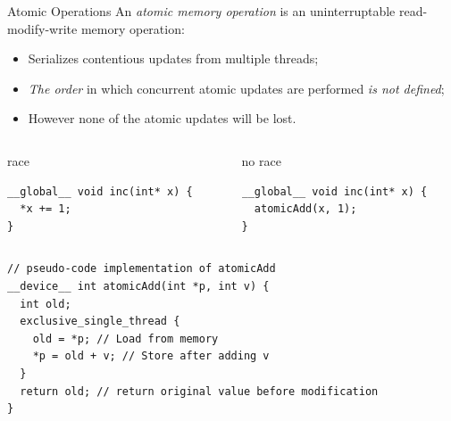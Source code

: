 \documentclass[aspectratio=43]{beamer}
\begin{document}
\begin{frame}[fragile]{Atomic Operations}
    An \emph{atomic memory operation} is an uninterruptable read-modify-write memory operation:
    \begin{itemize}
        \item Serializes contentious updates from multiple threads;
        \item \emph{The order} in which concurrent atomic updates are performed \emph{is not defined};
        \item However none of the atomic updates will be lost.
    \end{itemize}
    \vspace{-0.3cm}
    \begin{columns}[T]
        \begin{column}{0.48\textwidth}
            \begin{code}{race}
                \begin{lstlisting}[style=boxcudatiny]
__global__ void inc(int* x) {
  *x += 1;
}
                 \end{lstlisting}
            \end{code}
        \end{column}

        \begin{column}{0.48\textwidth}
            \begin{code}{no race}
                \begin{lstlisting}[style=boxcudatiny]
__global__ void inc(int* x) {
  atomicAdd(x, 1);
}
                \end{lstlisting}
            \end{code}
        \end{column}
    \end{columns}

    \begin{code}{}
        \begin{lstlisting}[style=boxcudatiny]
// pseudo-code implementation of atomicAdd
__device__ int atomicAdd(int *p, int v) {
  int old;
  exclusive_single_thread {
    old = *p; // Load from memory
    *p = old + v; // Store after adding v
  }
  return old; // return original value before modification
}
        \end{lstlisting}
    \end{code}

\end{frame}
\end{document}
